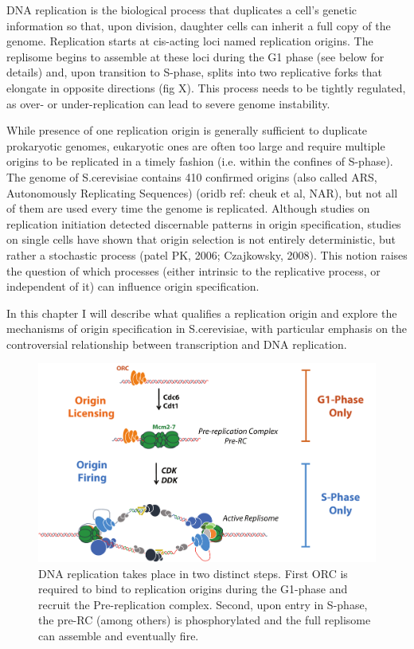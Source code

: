 DNA replication is the biological process that duplicates a cell’s genetic information so that, upon division, daughter cells can inherit a full copy of the genome. Replication starts at cis-acting loci named replication origins. The replisome begins to assemble at these loci during the G1 phase (see below for details) and, upon transition to S-phase, splits into two replicative forks that elongate in opposite directions (fig X). This process needs to be tightly regulated, as over- or under-replication can lead to severe genome instability. 

While presence of one replication origin is generally sufficient to duplicate prokaryotic genomes, eukaryotic ones are often too large and require multiple origins to be replicated in a timely fashion (i.e. within the confines of S-phase). The genome of S.cerevisiae contains 410 confirmed origins (also called ARS, Autonomously Replicating Sequences) (oridb ref: cheuk et al, NAR), but not all of them are used every time the genome is replicated. Although studies on replication initiation detected discernable patterns in origin specification, studies on single cells have shown that origin selection is not entirely deterministic, but rather a stochastic process (patel PK, 2006; Czajkowsky, 2008). This notion raises the question of which processes (either intrinsic to the replicative process, or independent of it) can influence origin specification.

In this chapter I will describe what qualifies a replication origin and explore the mechanisms of origin specification in S.cerevisiae, with particular emphasis on the controversial relationship between transcription and DNA replication.


\begin{figure}[ht]

\centering
\includegraphics[width=\textwidth]{figures/introduction/repSteps}
\caption[Stepwise mechanism of DNA replication]{DNA replication takes place in two distinct steps. First ORC is required to bind to replication origins during the G1-phase and recruit the Pre-replication complex. Second, upon entry in S-phase, the pre-RC (among others) is phosphorylated and the full replisome can assemble and eventually fire.}
\label{fig:repSteps}

\end{figure}


